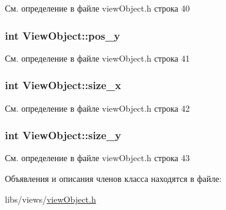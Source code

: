 См. определение в файле view\-Object.\-h строка 40

\hypertarget{class_view_object_a0a3348dc8dc5d381b319075ad7ea44d9}{
\subsubsection[{pos\-\_\-y}]{\setlength{\rightskip}{0pt plus 5cm}int View\-Object\-::pos\-\_\-y\hspace{0.3cm}{\ttfamily [private]}}}\label{class_view_object_a0a3348dc8dc5d381b319075ad7ea44d9}


См. определение в файле view\-Object.\-h строка 41

\hypertarget{class_view_object_a484420a1d615725e2d0cdb84d18bcb0a}{
\subsubsection[{size\-\_\-x}]{\setlength{\rightskip}{0pt plus 5cm}int View\-Object\-::size\-\_\-x\hspace{0.3cm}{\ttfamily [private]}}}\label{class_view_object_a484420a1d615725e2d0cdb84d18bcb0a}


См. определение в файле view\-Object.\-h строка 42

\hypertarget{class_view_object_a5373493aa3161f641a30d999790fa06f}{
\subsubsection[{size\-\_\-y}]{\setlength{\rightskip}{0pt plus 5cm}int View\-Object\-::size\-\_\-y\hspace{0.3cm}{\ttfamily [private]}}}\label{class_view_object_a5373493aa3161f641a30d999790fa06f}


См. определение в файле view\-Object.\-h строка 43



Объявления и описания членов класса находятся в файле\-:\begin{DoxyCompactItemize}
\item 
libs/views/\hyperlink{view_object_8h}{view\-Object.\-h}\end{DoxyCompactItemize}
